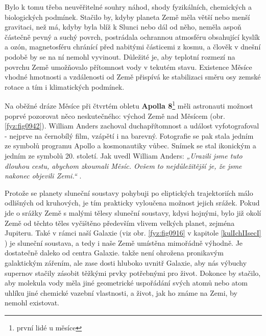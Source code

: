       Bylo k tomu třeba neuvěřitelné souhry náhod, shody fyzikálních, chemických a biologických
      podmínek. Stačilo by, kdyby planeta Země měla větší nebo menší gravitaci, než má, kdyby byla
      blíž k Slunci nebo dál od něho, neměla aspoň částečně pevný a suchý povrch, postrádala
      ochrannou atmosféru obsahující kyslík a ozón, magnetosféru chránící před nabitými částicemi z
      kosmu, a člověk v dnešní podobě by se na ní nemohl vyvinout. Důležité je, aby teplotní rozmezí
      na povrchu Země umožňovalo přítomnost vody v tekutém stavu. Existence Měsíce vhodné hmotnosti
      a vzdálenosti od Země přispívá ke stabilizaci směru osy zemské rotace a tím i klimatických
      podmínek.


      Na oběžné dráze Měsíce při čtvrtém obletu \textbf{Apolla 8}\footnote{první lidé u měsíce} měli
      astronauti možnost poprvé pozorovat něco neskutečného: východ Země nad Měsícem (obr.
      \ref{fyz:fig0942}). William Anders zachoval duchapřítomnost a událost vyfotografoval - nejprve
      na černobílý film, vzápětí i na barevný. Fotografie se pak stala jedním ze symbolů programu
      Apollo a kosmonautiky vůbec. Snímek se stal ikonickým a jedním ze symbolů 20. století. Jak
      uvedl William Anders: \emph{„Urazili jsme tuto dlouhou cestu, abychom zkoumali Měsíc. Ovšem to
      nejdůležitější je, že jsme nakonec objevili Zemi.“} \cite[s.~69]{Prikryl2019}.

      Protože se planety sluneční soustavy pohybuji po eliptických trajektoriích málo odlišných od
      kruhových, je tím prakticky vyloučena možnost jejich srážek. Pokud jde o srážky Země s malými
      tělesy sluneční soustavy, kdysi hojnými, bylo již okolí Země od těchto těles vyčištěno
      především vlivem velkých planet, zejména Jupiteru. Také v rámci naší Galaxie (viz obr.
      \ref{fyz:fig0916} v kapitole \ref{kulIchIIsecI} ) je sluneční soustava, a
      tedy i naše Země umístěna mimořádně výhodně. Je dostatečně daleko od centra Galaxie. takže
      není ohrožena pronikavým galaktickým zářením, ale zase dosti hluboko uvnitř Galaxie, aby nás
      výbuchy supernov stačily zásobit těžkými prvky potřebnými pro život. Dokonce by stačilo, aby
      molekula vody měla jiné geometrické uspořádání svých atomů nebo atom uhlíku jiné chemické
      vazební vlastnosti, a život, jak ho známe na Zemi, by nemohl existovat.

